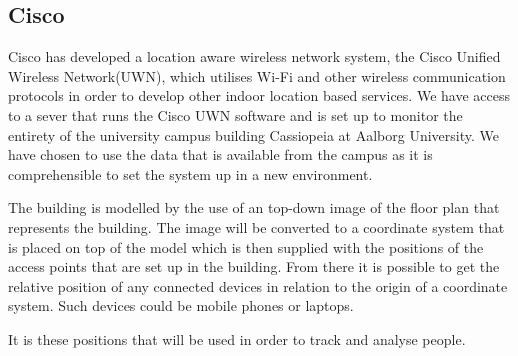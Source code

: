 \subsection{Cisco}\label{subsec:cisco}
Cisco has developed a location aware wireless network system, the Cisco Unified Wireless Network(UWN), which utilises Wi-Fi and other wireless communication protocols in order to develop other indoor location based services\cite{uwn}. We have access to a sever that runs the Cisco UWN software and is set up to monitor the entirety of the university campus building Cassiopeia at Aalborg University. We have chosen to use the data that is available from the campus as it is comprehensible to set the system up in a new environment. 

The building is modelled by the use of an top-down image of the floor plan that represents the building. The image will be converted to a coordinate system that is placed on top of the model which is then supplied with the positions of the access points that are set up in the building. From there it is possible to get the relative position of any connected devices in relation to the origin of a coordinate system. Such devices could be mobile phones or laptops. 

It is these positions that will be used in order to track and analyse people.
